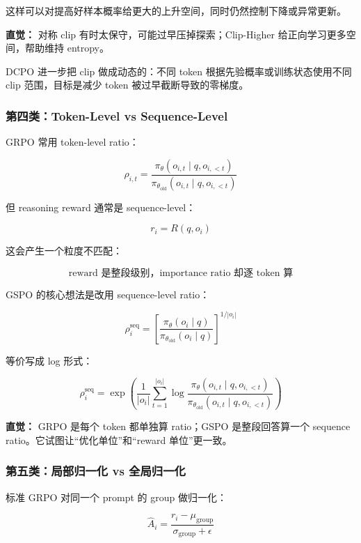 这样可以对提高好样本概率给更大的上升空间，同时仍然控制下降或异常更新。

\begin{intubox}
\textbf{直觉：} 对称 clip 有时太保守，可能过早压掉探索；Clip-Higher 给正向学习更多空间，帮助维持 entropy。
\end{intubox}

DCPO 进一步把 clip 做成动态的：不同 token 根据先验概率或训练状态使用不同 clip 范围，目标是减少 token 被过早截断导致的零梯度。

\subsubsection{第四类：Token-Level vs Sequence-Level}

GRPO 常用 token-level ratio：

\[
\rho_{i,t}
=
\frac{
\pi_\theta(o_{i,t}\mid q,o_{i,<t})
}{
\pi_{\theta_\text{old}}(o_{i,t}\mid q,o_{i,<t})
}
\]

但 reasoning reward 通常是 sequence-level：

\[
r_i = R(q,o_i)
\]

这会产生一个粒度不匹配：

\[
\text{reward 是整段级别，importance ratio 却逐 token 算}
\]

GSPO 的核心想法是改用 sequence-level ratio：

\[
\rho_i^\text{seq}
=
\left[
\frac{
\pi_\theta(o_i \mid q)
}{
\pi_{\theta_\text{old}}(o_i \mid q)
}
\right]^{1/|o_i|}
\]

等价写成 log 形式：

\[
\rho_i^\text{seq}
=
\exp
\left(
\frac{1}{|o_i|}
\sum_{t=1}^{|o_i|}
\log
\frac{
\pi_\theta(o_{i,t}\mid q,o_{i,<t})
}{
\pi_{\theta_\text{old}}(o_{i,t}\mid q,o_{i,<t})
}
\right)
\]

\begin{summarybox}
\textbf{直觉：} GRPO 是每个 token 都单独算 ratio；GSPO 是整段回答算一个 sequence ratio。它试图让“优化单位”和“reward 单位”更一致。
\end{summarybox}

\subsubsection{第五类：局部归一化 vs 全局归一化}

标准 GRPO 对同一个 prompt 的 group 做归一化：

\[
\hat{A}_i
=
\frac{r_i-\mu_\text{group}}{\sigma_\text{group}+\epsilon}
\]

